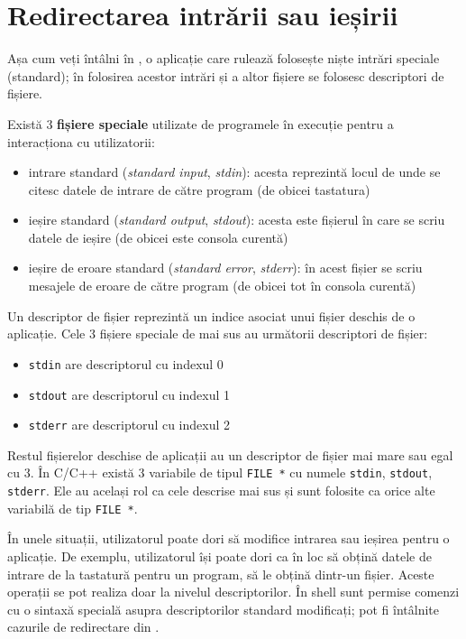 \section{Redirectarea intrării sau ieșirii}
\label{sec:fs:redirect}

Așa cum veți întâlni în , o aplicație care rulează folosește niște intrări speciale (standard);
în folosirea acestor intrări și a altor fișiere se folosesc descriptori de fișiere.

Există 3 \textbf{fișiere speciale} utilizate de programele în execuție pentru a interacționa cu utilizatorii:

\begin{itemize}
  \item intrare standard (\textit{standard input}, \textit{stdin}): acesta reprezintă locul de unde se citesc datele de intrare de către program (de obicei tastatura)
  \item ieșire standard (\textit{standard output}, \textit{stdout}): acesta este fișierul în care se scriu datele de ieșire (de obicei este consola curentă)
  \item ieșire de eroare standard (\textit{standard error}, \textit{stderr}): în acest fișier se scriu mesajele de eroare de către program (de obicei tot în consola curentă)
\end{itemize}

Un descriptor de fișier reprezintă un indice asociat unui fișier deschis de o aplicație.
Cele 3 fișiere speciale de mai sus au următorii descriptori de fișier:

\begin{itemize}
  \item \texttt{stdin} are descriptorul cu indexul 0
  \item \texttt{stdout} are descriptorul cu indexul 1
  \item \texttt{stderr} are descriptorul cu indexul 2
\end{itemize}

Restul fișierelor deschise de aplicații au un descriptor de fișier mai mare sau egal cu 3.
În C/C++ există 3 variabile de tipul \texttt{FILE *} cu numele \texttt{stdin}, \texttt{stdout}, \texttt{stderr}.
Ele au același rol ca cele descrise mai sus și sunt folosite ca orice alte variabilă de tip \texttt{FILE *}.

În unele situații, utilizatorul poate dori să modifice intrarea sau ieșirea pentru o aplicație.
De exemplu, utilizatorul își poate dori ca în loc să obțină datele de intrare de la tastatură pentru un program, să le obțină dintr-un fișier.
Aceste operații se pot realiza doar la nivelul descriptorilor.
În shell sunt permise comenzi cu o sintaxă specială asupra descriptorilor standard modificați;
pot fi întâlnite cazurile de redirectare din .

